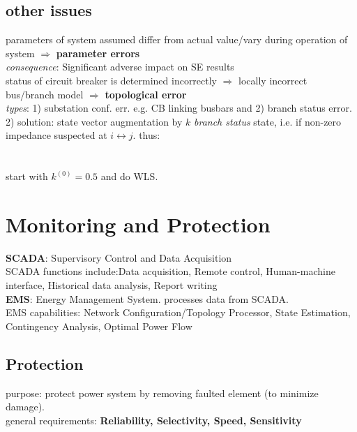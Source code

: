 \documentclass[a4paper,10pt,landscape]{scrartcl}
\begin{document}
\begin{multicols*}{3}
\subsection{other issues}
parameters of system assumed differ from actual value/vary during operation of system $\Rightarrow$ \textbf{parameter errors} \\
\textit{consequence}: Significant adverse impact on SE results \\
status of circuit breaker is determined incorrectly $\Rightarrow$
locally incorrect bus/branch model $\Rightarrow$ \textbf{topological error} \\
\textit{types}: 1) substation conf. err. e.g. CB linking busbars and 2) branch status error. \\
2) solution: state vector augmentation by $k$ \textit{branch status} state, i.e. if non-zero impedance suspected at $i\leftrightarrow j$. thus: \\
 \\
 \\
start with $k^{(0)}=0.5$ and do WLS.



\section{Monitoring and Protection}
\textbf{SCADA}: Supervisory Control and Data Acquisition \\
SCADA functions include:Data acquisition, Remote control, Human-machine interface, Historical data analysis, Report writing \\
\textbf{EMS}: Energy Management System. processes data from SCADA. \\
EMS capabilities: Network Configuration/Topology Processor, State Estimation, Contingency Analysis, Optimal Power Flow

\subsection{Protection}
purpose: protect power system by removing faulted element (to minimize damage). \\
general requirements: \textbf{Reliability, Selectivity, Speed, Sensitivity} \\


\end{multicols*}
\end{document}
